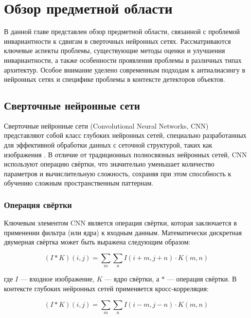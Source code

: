 \section{Обзор предметной области} 
\label{review}

В данной главе представлен обзор предметной области, связанной с проблемой инвариантности к сдвигам в сверточных нейронных сетях. Рассматриваются ключевые аспекты проблемы, существующие методы оценки и улучшения инвариантности, а также особенности проявления проблемы в различных типах архитектур. Особое внимание уделено современным подходам к антиалиасингу в нейронных сетях и специфике проблемы в контексте детекторов объектов.

\subsection{Сверточные нейронные сети}
\label{review:cnn}

Сверточные нейронные сети (Convolutional Neural Networks, CNN) представляют собой класс глубоких нейронных сетей, специально разработанных для эффективной обработки данных с сеточной структурой, таких как изображения \cite{lecun1998gradient}. В отличие от традиционных полносвязных нейронных сетей, CNN используют операцию свёртки, что значительно уменьшает количество параметров и вычислительную сложность, сохраняя при этом способность к обучению сложным пространственным паттернам.

\subsubsection{Операция свёртки}
\label{review:cnn:convolution}

Ключевым элементом CNN является операция свёртки, которая заключается в применении фильтра (или ядра) к входным данным. Математически дискретная двумерная свёртка может быть выражена следующим образом:

\begin{equation}
(I * K)(i, j) = \sum_{m}\sum_{n} I(i+m, j+n) \cdot K(m, n)
\end{equation}

где $I$ — входное изображение, $K$ — ядро свёртки, а $*$ — операция свёртки. В контексте глубоких нейронных сетей применяется кросс-корреляция:

\begin{equation}
(I * K)(i, j) = \sum_{m}\sum_{n} I(i-m, j-n) \cdot K(m, n)
\end{equation}

